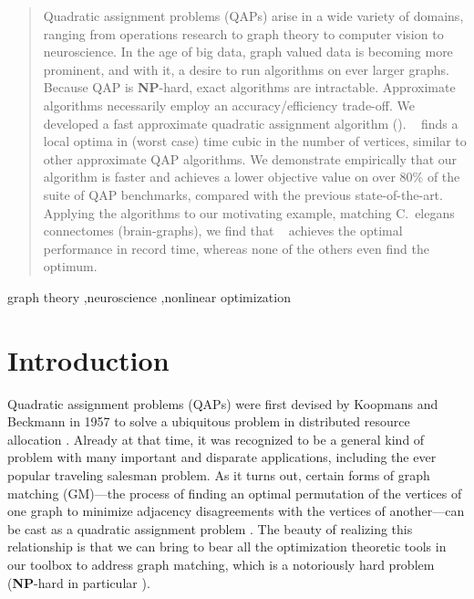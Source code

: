 \documentclass[preprint,11pt]{elsarticle}
\begin{document}
\begin{frontmatter}
\begin{abstract}
Quadratic assignment problems (QAPs) arise in a wide variety of domains, ranging from operations research to graph theory to computer vision to neuroscience.  In the age of big data, graph valued data is becoming more prominent, and with it, a desire to run algorithms on ever larger graphs.  Because QAP is \textbf{NP}-hard, exact algorithms are intractable.  Approximate algorithms necessarily employ an accuracy/efficiency trade-off. We developed a fast approximate quadratic assignment algorithm (\FAQ). \FAQ~ finds a local optima in (worst case) time cubic in the number of vertices, similar to other approximate QAP algorithms.  We demonstrate empirically that our algorithm is faster and achieves a lower objective value on over $80\%$ of the suite of QAP benchmarks, compared with the previous state-of-the-art.  Applying the algorithms to our motivating example, matching C.~elegans connectomes (brain-graphs), we find that \FAQ~ achieves the optimal performance in record time, whereas none of the others even find the optimum.
\end{abstract}

\begin{keyword}

graph theory \sep neuroscience \sep nonlinear optimization


\end{keyword}


\end{frontmatter}




\newpage
\section{Introduction}

Quadratic assignment problems (QAPs) were first devised by Koopmans and Beckmann in 1957 to solve a ubiquitous problem in distributed resource allocation \cite{Koopmans1957}. 
Already at that time, it was recognized to be a general kind of problem with many important and disparate applications, including the ever popular traveling salesman problem.  As it turns out, certain forms of graph matching (GM)---the process of finding an optimal permutation of the vertices of one graph to minimize adjacency disagreements with the vertices of another---can be cast as a quadratic assignment problem \cite{Umeyama1988}. The beauty of realizing this relationship is that we can bring to bear all the optimization theoretic tools in our toolbox to address graph matching, which is a notoriously hard problem (\textbf{NP}-hard in particular \cite{Papadimitriou1998}).
\end{document}
